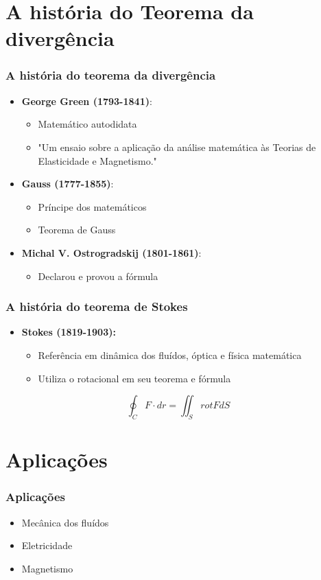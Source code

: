 \section{A história do Teorema da divergência}
\begin{frame}
    \frametitle{A história do teorema da divergência}
    \begin{itemize}
        \item \textbf{George Green (1793-1841)}:
              \begin{itemize}
                  \item Matemático autodidata
                  \item "Um ensaio sobre a aplicação da análise matemática às Teorias de Elasticidade e Magnetismo."
              \end{itemize}
        \item \textbf{Gauss (1777-1855)}:
              \begin{itemize}
                  \item Príncipe dos matemáticos
                  \item Teorema de Gauss
              \end{itemize}
        \item \textbf{Michal V. Ostrogradskij (1801-1861)}:
              \begin{itemize}
                  \item Declarou e provou a fórmula
              \end{itemize}
    \end{itemize}
\end{frame}

\begin{frame}
    \frametitle{A história do teorema de Stokes}
    \begin{itemize}
        \item \textbf{Stokes (1819-1903):}
              \begin{itemize}
                  \item Referência em dinâmica dos fluídos, óptica e física matemática
                  \item Utiliza o rotacional em seu teorema e fórmula
              \end{itemize}
    \end{itemize}
    \vspace{5mm}
    \begin{equation*}
        \oint_C F \cdot dr = \iint_S rot F dS
    \end{equation*}
\end{frame}

\section{Aplicações}
\begin{frame}
    \frametitle{Aplicações}
    \begin{itemize}
        \item Mecânica dos fluídos
        \item Eletricidade
        \item Magnetismo
    \end{itemize}
\end{frame}
